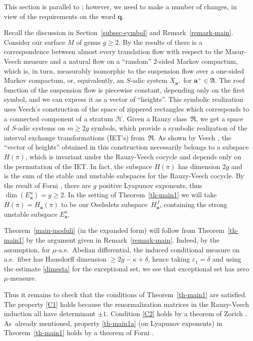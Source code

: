 \documentclass[10pt]{amsart}
\let\mathcal\mathscr
\let\epsilon\varepsilon
\theoremstyle{plain}
\theoremstyle{definition}
\newcommand\bom{{\boldsymbol a}}\let\ba\bom
\newcommand\bq{{\boldsymbol q}}
\newcommand\FrA{\mathfrak{A}}
\newcommand\FrR{\mathfrak{R}}
\newcommand\Hk{\mathcal{H}}
\begin{document}
This section is parallel to \cite[\S11]{BuSo18a}; however, we need to make a number of changes, in view of the requirements on the word $\bq$.

Recall the discussion in Section~\ref{subsec-symbol} and Remark~\ref{remark-main}.
Consider our surface $M$ of genus $g\ge 2$. By the results of \cite[\S4]{Buf-umn} there is a correspondence between almost every translation flow with respect to the Masur-Veech measure and a natural flow on a ``random'' 2-sided Markov compactum, which is, in turn, measurably isomorphic to the suspension flow over a one-sided Markov compactum, or, equivalently, an $S$-adic system $X_{\bom^+}$ for $\bom^+\in \FrA$. The roof function of the suspension flow is piecewise constant, depending only on the first symbol, and we can express it as a vector of ``heights''. This symbolic realization uses Veech's construction \cite{veech} of the space of zippered rectangles which corresponds to a connected component of a stratum $\Hk$. Given a Rauzy class~$\FrR$, we get a space of $S$-adic systems on $m\ge 2g$ symbols, which provide a symbolic realization of the interval exchange transformations (IET's) from~$\FrR$. As shown by Veech \cite{veechamj}, the ``vector of heights'' obtained in this construction necessarily belongs to a subspace $H(\pi)$, which is invariant under the Rauzy-Veech cocycle and depends only on the permutation of the IET. In fact, the subspace $H(\pi)$ has dimension $2g$ and is the sum of the stable and unstable subspaces for the Rauzy-Veech cocycle. By the result of Forni \cite{Forni}, there are $g$ positive Lyapunov exponents, thus $\dim(E^u_\bom)=g\ge 2$. In the setting of Theorem~\ref{th-main1} we will take $H(\pi) = H_\bom(\pi)$ to be our Oseledets subspace~$H^J_\bom$, containing the strong unstable subspace $E^u_\bom$.

Theorem~\ref{main-moduli} (in the expanded form) will follow from Theorem~\ref{th-main1} by the argument given in Remark~\ref{remark-main}. Indeed, by the assumption, for $\mu$-a.e.\ Abelian differential, the induced conditional measure on a.e.\ fiber has Hausdorff dimension $\ge 2g-\kappa + \delta$, hence taking $\epsilon_1=\delta$ and using the estimate \eqref{dimesta} for the exceptional set, we see that exceptional set has zero $\mu$-measure.

Thus it remains to check that the conditions of Theorem~\ref{th-main1} are satisfied. The property \eqref{C1} holds because the renormalization matrices in the Rauzy-Veech induction all have determinant $\pm 1$. Condition \eqref{C2} holds by a theorem of Zorich \cite{Zorich}. As~already mentioned, property \eqref{th-main1a} (on Lyapunov exponents) in Theorem~\ref{th-main1} holds by a theorem of Forni \cite{Forni}.
\end{document}
